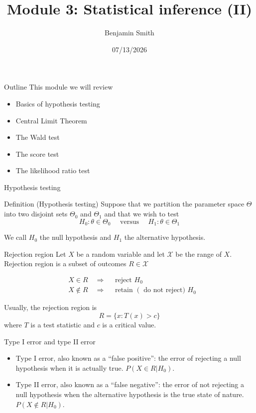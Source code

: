 \documentclass[
  ignorenonframetext,
]{beamer}
\title{\texorpdfstring{Module 3: Statistical inference
(II)}{Module 3: Statistical inference (II)}}
\author{\texorpdfstring{Benjamin Smith}{Benjamin Smith}}
\date{07/13/2026}
\providecommand{\tightlist}{%
  \setlength{\itemsep}{0pt}\setlength{\parskip}{0pt}}
\begin{document}
\frame{\titlepage}

\begin{frame}{Outline}
\protect{}\label{outline}
This module we will review

\begin{itemize}
\tightlist
\item
  Basics of hypothesis testing
\item
  Central Limit Theorem
\item
  The Wald test
\item
  The score test
\item
  The likelihood ratio test
\end{itemize}
\end{frame}

\begin{frame}{Hypothesis testing}
\protect{}\label{hypothesis-testing}
\begin{block}{Definition (Hypothesis testing)}
\protect{}\label{definition-hypothesis-testing}
Suppose that we partition the parameter space \(\Theta\) into two
disjoint sets \(\Theta_{0}\) and \(\Theta_{1}\) and that we wish to test
\[
H_{0}: \theta \in \Theta_{0} \quad \text { versus } \quad H_{1}: \theta \in \Theta_{1}
\]
\end{block}

We call \(H_{0}\) the null hypothesis and \(H_{1}\) the alternative
hypothesis.
\end{frame}

\begin{frame}{Rejection region}
\protect{}\label{rejection-region}
Let \(X\) be a random variable and let \(\mathcal{X}\) be the range of
\(X\). Rejection region is a subset of outcomes \(R \in \mathcal{X}\)

\[
\begin{aligned}
&X \in R \quad \Longrightarrow \quad \text { reject } H_{0} \\
&X \notin R \quad \Longrightarrow \quad \text { retain }\left(\text { do not reject) } H_{0}\right.
\end{aligned}
\]

Usually, the rejection region is \[
R=\{x: T(x)>c\}
\] where \(T\) is a test statistic and \(c\) is a critical value.
\end{frame}

\begin{frame}{Type I error and type II error}
\protect{}\label{type-i-error-and-type-ii-error}
\begin{itemize}
\item
  Type I error, also known as a ``false positive'': the error of
  rejecting a null hypothesis when it is actually true.
  \(P(X\in R|H_0)\).
\item
  Type II error, also known as a ``false negative'': the error of not
  rejecting a null hypothesis when the alternative hypothesis is the
  true state of nature. \(P(X\notin R|H_0)\).
\end{itemize}
\end{frame}
\end{document}
